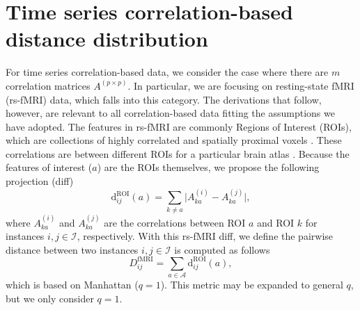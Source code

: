 \documentclass[aoas]{imsart}
\begin{document}
\section{Time series correlation-based distance distribution}\label{sec:rs-fMRI_distances}

For time series correlation-based data, we consider the case where there are $m$ correlation matrices $A^{(p \times p)}$. In particular, we are focusing on resting-state fMRI (rs-fMRI) data, which falls into this category. The derivations that follow, however, are relevant to all correlation-based data fitting the assumptions we have adopted. The features in rs-fMRI are commonly Regions of Interest (ROIs), which are collections of highly correlated and spatially proximal voxels \cite{lee2013}. These correlations are between different ROIs for a particular brain atlas \cite{dickie2017}. Because the features of interest ($a$) are the ROIs themselves, we propose the following projection (diff)
%
\begin{equation}\label{eq:diff_rs-fMRI}
\text{d}^\text{ROI}_{ij}(a) = \sum_{k \neq a}\bigl|A^{(i)}_{ka} - A^{(j)}_{ka}\bigr|,
\end{equation}
%
where $A^{(i)}_{ka}$ and $A^{(j)}_{ka}$ are the correlations between ROI $a$ and ROI $k$ for instances $i,j \in \mathcal{I}$, respectively. With this rs-fMRI diff, we define the pairwise distance between two instances $i,j \in \mathcal{I}$ is computed as follows
%
\begin{equation}\label{eq:D_rs-fMRI}
D^\text{fMRI}_{ij} = \sum_{a \in \mathcal{A}} \text{d}^\text{ROI}_{ij}(a),
\end{equation}
%
which is based on Manhattan ($q=1$). This metric may be expanded to general $q$, but we only consider $q=1$.
\end{document}
